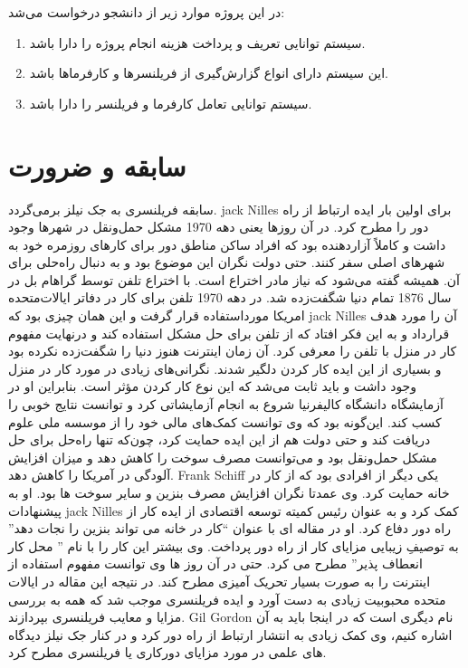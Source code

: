 در این پروژه موارد زیر از دانشجو درخواست می‌شد:
\begin{enumerate}
	\item
سیستم توانایی تعریف و پرداخت هزینه انجام پروژه را دارا باشد.
\item
این سیستم دارای انواع گزارش‌گیری از فریلنسرها و کارفرماها باشد.
\item
سیستم توانایی تعامل کارفرما و فریلنسر را دارا باشد.
\end{enumerate}

\section{سابقه و ضرورت}
سابقه فریلنسری به جک نیلز برمی‌گردد. jack Nilles برای اولین بار ایده ارتباط از راه دور را مطرح کرد.
در آن روزها یعنی دهه 1970 مشکل حمل‌ونقل در شهرها وجود داشت و کاملاً آزاردهنده بود که افراد ساکن مناطق دور برای کارهای روزمره خود به شهرهای اصلی سفر کنند.
حتی دولت نگران این موضوع بود و به دنبال راه‌حلی برای آن. همیشه گفته می‌شود که نیاز مادر اختراع است.
با اختراع تلفن توسط گراهام بل در سال 1876 تمام دنیا شگفت‌زده شد. در دهه 1970 تلفن برای کار در دفاتر ایالات‌متحده امریکا مورداستفاده قرار گرفت و این همان چیزی بود که jack Nilles آن را مورد هدف قرارداد و به این فکر افتاد که از تلفن برای حل مشکل استفاده کند و درنهایت مفهوم کار در منزل با تلفن را معرفی کرد.
آن زمان اینترنت هنوز دنیا را شگفت‌زده نکرده بود و بسیاری از این ایده کار کردن دلگیر شدند.
نگرانی‌های زیادی در مورد کار در منزل وجود داشت و باید ثابت می‌شد که این نوع کار کردن مؤثر است.
بنابراین او در آزمایشگاه دانشگاه کالیفرنیا شروع به انجام آزمایشاتی کرد و توانست نتایج خوبی را کسب کند.
این‌گونه بود که وی توانست کمک‌های مالی خود را از موسسه ملی علوم دریافت کند و حتی دولت هم از این ایده حمایت کرد، چون‌که تنها راه‌حل برای حل مشکل حمل‌ونقل بود و می‌توانست مصرف سوخت را کاهش دهد و میزان افزایش آلودگی در آمریکا را کاهش دهد.
Frank Schiff یکی دیگر از افرادی بود که از کار در خانه حمایت کرد. وی عمدتا نگران افزایش مصرف بنزین و سایر سوخت ها بود. او به پیشنهادات jack Nilles کمک کرد و به عنوان رئیس کمیته توسعه اقتصادی از ایده کار از راه دور دفاع کرد. او در مقاله ای با عنوان “کار در خانه می تواند بنزین را نجات دهد” به توصیفِ زیبایی مزایای کار از راه دور پرداخت. وی بیشتر این کار را با نام ” محل کار انعطاف پذیر” مطرح می کرد. حتی در آن روز ها وی توانست مفهوم استفاده از اینترنت را به صورت بسیار تحریک آمیزی مطرح کند. در نتیجه این مقاله در ایالات متحده محبوبیت زیادی به دست آورد و ایده فریلنسری موجب شد که همه به بررسی مزایا و معایب فریلنسری بپردازند. Gil Gordon نام دیگری است که در اینجا باید به آن اشاره کنیم، وی کمک زیادی به انتشار ارتباط از راه دور کرد و در کنار جک نیلز دیدگاه های علمی در مورد مزایای دورکاری یا فریلنسری مطرح کرد.

